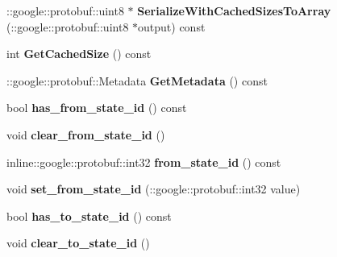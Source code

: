 \begin{DoxyCompactItemize}
\item 
\hypertarget{classgraph_1_1EdgeStatePotential_ae394d1b9b82141a8b358a3adbc06c88d}{
::google::protobuf::uint8 $\ast$ {\bfseries SerializeWithCachedSizesToArray} (::google::protobuf::uint8 $\ast$output) const }
\label{classgraph_1_1EdgeStatePotential_ae394d1b9b82141a8b358a3adbc06c88d}

\item 
\hypertarget{classgraph_1_1EdgeStatePotential_acd032f41037bb2d600aead1931aba43c}{
int {\bfseries GetCachedSize} () const }
\label{classgraph_1_1EdgeStatePotential_acd032f41037bb2d600aead1931aba43c}

\item 
\hypertarget{classgraph_1_1EdgeStatePotential_aae22278c4ce7ca0e25385e9a9212d861}{
::google::protobuf::Metadata {\bfseries GetMetadata} () const }
\label{classgraph_1_1EdgeStatePotential_aae22278c4ce7ca0e25385e9a9212d861}

\item 
\hypertarget{classgraph_1_1EdgeStatePotential_a5f9ee1db6bb4e2db964624974a6c506f}{
bool {\bfseries has\_\-from\_\-state\_\-id} () const }
\label{classgraph_1_1EdgeStatePotential_a5f9ee1db6bb4e2db964624974a6c506f}

\item 
\hypertarget{classgraph_1_1EdgeStatePotential_a5a02ced96b71190c158d0fb81bf00fd5}{
void {\bfseries clear\_\-from\_\-state\_\-id} ()}
\label{classgraph_1_1EdgeStatePotential_a5a02ced96b71190c158d0fb81bf00fd5}

\item 
\hypertarget{classgraph_1_1EdgeStatePotential_adcdf4b14113ac0259bafb2bf142d19f0}{
inline::google::protobuf::int32 {\bfseries from\_\-state\_\-id} () const }
\label{classgraph_1_1EdgeStatePotential_adcdf4b14113ac0259bafb2bf142d19f0}

\item 
\hypertarget{classgraph_1_1EdgeStatePotential_ab23b81819bc6d9dd71d319c49412c8d8}{
void {\bfseries set\_\-from\_\-state\_\-id} (::google::protobuf::int32 value)}
\label{classgraph_1_1EdgeStatePotential_ab23b81819bc6d9dd71d319c49412c8d8}

\item 
\hypertarget{classgraph_1_1EdgeStatePotential_a1c2e8dc8b84f5aacf08e5c46866f04c6}{
bool {\bfseries has\_\-to\_\-state\_\-id} () const }
\label{classgraph_1_1EdgeStatePotential_a1c2e8dc8b84f5aacf08e5c46866f04c6}

\item 
\hypertarget{classgraph_1_1EdgeStatePotential_a7f30d4b4ff6eb1c6695799be4eeefea5}{
void {\bfseries clear\_\-to\_\-state\_\-id} ()}
\label{classgraph_1_1EdgeStatePotential_a7f30d4b4ff6eb1c6695799be4eeefea5}


\end{DoxyCompactItemize}
